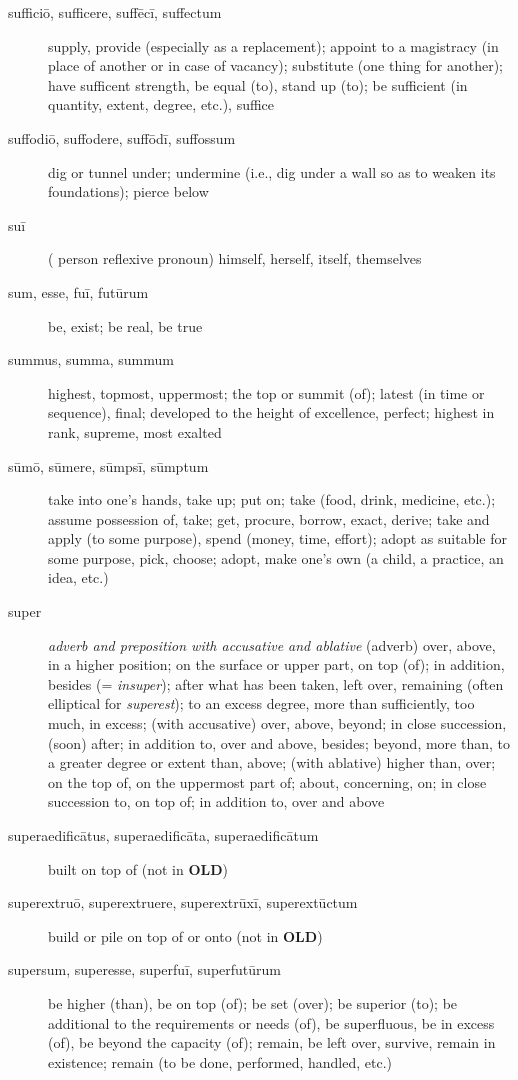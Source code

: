 \begin{description}
    \item[sufficiō, sufficere, suffēcī, suffectum] supply, provide (especially as a replacement); appoint to a magistracy (in place of another or in case of vacancy); substitute (one thing for another); have sufficent strength, be equal (to), stand up (to); be sufficient (in quantity, extent, degree, etc.), suffice
    \item[suffodiō, suffodere, suffōdī, suffossum] dig or tunnel under; undermine (i.e., dig under a wall so as to weaken its foundations); pierce below
    \item[suī] \marginnote{*}( person reflexive pronoun) himself, herself, itself, themselves
    \item[sum, esse, fuī, futūrum] \marginnote{*}be, exist; be real, be true
    \item[summus, summa, summum] highest, topmost, uppermost; the top or summit (of); latest (in time or sequence), final; developed to the height of excellence, perfect; highest in rank, supreme, most exalted
    \item[sūmō, sūmere, sūmpsī, sūmptum] \marginnote{*}\marginnote{*}take into one's hands, take up; put on; take (food, drink, medicine, etc.); assume possession of, take; get, procure, borrow, exact, derive; take and apply (to some purpose), spend (money, time, effort); adopt as suitable for some purpose, pick, choose; adopt, make one's own (a child, a practice, an idea, etc.)
    \item[super] \marginnote{*}\textit{adverb and preposition with accusative and ablative} (adverb) over, above, in a higher position; on the surface or upper part, on top (of); in addition, besides (= \textit{insuper}); after what has been taken, left over, remaining (often elliptical for \textit{superest}); to an excess degree, more than sufficiently, too much, in excess; (with accusative) over, above, beyond; in close succession, (soon) after; in addition to, over and above, besides; beyond, more than, to a greater degree or extent than, above; (with ablative) higher than, over; on the top of, on the uppermost part of; about, concerning, on; in close succession to, on top of; in addition to, over and above
    \item[superaedificātus, superaedificāta, superaedificātum] built on top of (not in \textbf{OLD})
    \item[superextruō, superextruere, superextrūxī, superextūctum] build or pile on top of or onto (not in \textbf{OLD})
    \item[supersum, superesse, superfuī, superfutūrum] \marginnote{*}be higher (than), be on top (of); be set (over); be superior (to); be additional to the requirements or needs (of), be superfluous, be in excess (of), be beyond the capacity (of); remain, be left over, survive, remain in existence; remain (to be done, performed, handled, etc.)

\end{description}
